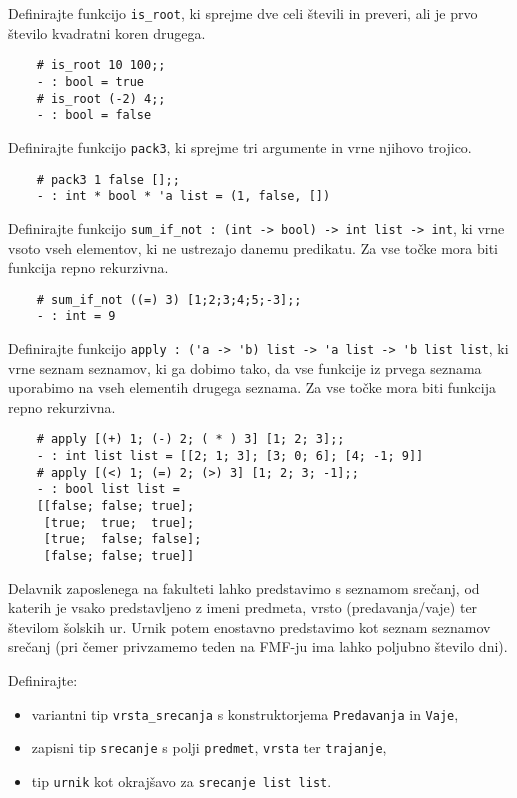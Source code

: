 \documentclass[arhiv]{../izpit}
\begin{document}
	
	
	
	\naloga
	
	\podnaloga Definirajte funkcijo \verb|is_root|, ki sprejme dve celi števili in preveri, ali je prvo število kvadratni koren drugega. 
	
	\begin{verbatim}
	# is_root 10 100;;
	- : bool = true
	# is_root (-2) 4;;
	- : bool = false
	\end{verbatim}
	
	\podnaloga Definirajte funkcijo \verb|pack3|, ki sprejme tri argumente in vrne njihovo trojico.
	\begin{verbatim}
	# pack3 1 false [];;
	- : int * bool * 'a list = (1, false, [])
	\end{verbatim}
	
	\podnaloga Definirajte funkcijo \verb|sum_if_not : (int -> bool) -> int list -> int|, ki vrne vsoto vseh elementov, ki ne ustrezajo danemu predikatu. Za vse točke mora biti funkcija repno rekurzivna.
	
	\begin{verbatim}
	# sum_if_not ((=) 3) [1;2;3;4;5;-3];;
	- : int = 9
	\end{verbatim}
	
	\podnaloga Definirajte funkcijo \verb|apply : ('a -> 'b) list -> 'a list -> 'b list list|, ki vrne seznam seznamov, ki ga dobimo tako, da vse funkcije iz prvega seznama uporabimo na vseh elementih drugega seznama. Za vse točke mora biti funkcija repno rekurzivna.
	
	\begin{verbatim}
	# apply [(+) 1; (-) 2; ( * ) 3] [1; 2; 3];;
	- : int list list = [[2; 1; 3]; [3; 0; 6]; [4; -1; 9]]
	# apply [(<) 1; (=) 2; (>) 3] [1; 2; 3; -1];;
	- : bool list list =
	[[false; false; true]; 
	 [true;  true;  true];
	 [true;  false; false]; 
	 [false; false; true]]
	\end{verbatim}

	
	\naloga
	Delavnik zaposlenega na fakulteti lahko predstavimo s seznamom srečanj, od katerih je vsako predstavljeno z imeni predmeta, vrsto (predavanja/vaje) ter številom šolskih ur. Urnik potem enostavno predstavimo kot seznam seznamov srečanj (pri čemer privzamemo teden na FMF-ju ima lahko poljubno število dni).
	
	\podnaloga 
	Definirajte:
	\begin{itemize}
		\item variantni tip \verb|vrsta_srecanja| s konstruktorjema \verb|Predavanja| in \verb|Vaje|,
		\item zapisni tip \verb|srecanje| s polji \verb|predmet|, \verb|vrsta| ter \verb|trajanje|,
		\item tip \verb|urnik| kot okrajšavo za \verb|srecanje list list|.
	\end{itemize}
\end{document}
